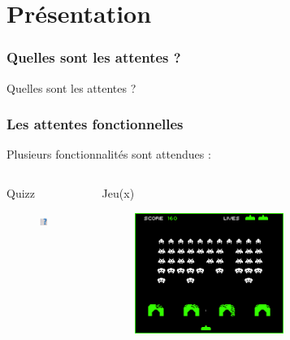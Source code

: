 \section{Présentation}
\begin{frame}
\tableofcontents[currentsection]
\end{frame}
\begin{frame}

  \frametitle{Quelles sont les attentes ?}
  
  \centering \huge{Quelles sont les attentes ?}

\end{frame}

\begin{frame}
  \frametitle{Les attentes fonctionnelles}
  \Large{Plusieurs fonctionnalités sont attendues :}
\bigskip
\bigskip
  \begin{columns}[t]
    \begin{column}{.5\textwidth}
      \centering \large Quizz
      \begin{figure}[!h]

        \begin{center}
          \includegraphics[width = 0.6\textwidth]{presentation/quizz.png}
         \end{center}
      \end{figure}
    \end{column}
    \begin{column}{.5\textwidth}
      \centering \large Jeu(x)
      \begin{figure}[!h]

        \begin{center}
          \includegraphics[width = 0.6\textwidth]{presentation/jeu.png}
        \end{center}
      \end{figure}
      

\end{column}
\end{columns}
\end{frame}
